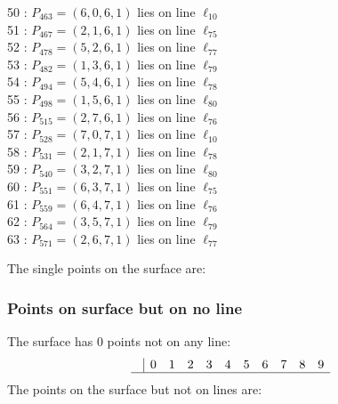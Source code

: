 \documentclass{article}
\begin{document}
{\begin{multicols}{2}
50 : $P_{463}=( 6, 0, 6, 1 )$ lies on line $\ell_{10}$\\
51 : $P_{467}=( 2, 1, 6, 1 )$ lies on line $\ell_{75}$\\
52 : $P_{478}=( 5, 2, 6, 1 )$ lies on line $\ell_{77}$\\
53 : $P_{482}=( 1, 3, 6, 1 )$ lies on line $\ell_{79}$\\
54 : $P_{494}=( 5, 4, 6, 1 )$ lies on line $\ell_{78}$\\
55 : $P_{498}=( 1, 5, 6, 1 )$ lies on line $\ell_{80}$\\
56 : $P_{515}=( 2, 7, 6, 1 )$ lies on line $\ell_{76}$\\
57 : $P_{528}=( 7, 0, 7, 1 )$ lies on line $\ell_{10}$\\
58 : $P_{531}=( 2, 1, 7, 1 )$ lies on line $\ell_{78}$\\
59 : $P_{540}=( 3, 2, 7, 1 )$ lies on line $\ell_{80}$\\
60 : $P_{551}=( 6, 3, 7, 1 )$ lies on line $\ell_{75}$\\
61 : $P_{559}=( 6, 4, 7, 1 )$ lies on line $\ell_{76}$\\
62 : $P_{564}=( 3, 5, 7, 1 )$ lies on line $\ell_{79}$\\
63 : $P_{571}=( 2, 6, 7, 1 )$ lies on line $\ell_{77}$\\
\end{multicols}
The single points on the surface are:\\
\subsubsection*{Points on surface but on no line}
The surface has 0 points not on any line:\\
$$
\begin{array}{r|*{10}{r}}
 & 0 & 1 & 2 & 3 & 4 & 5 & 6 & 7 & 8 & 9\\
\hline
\end{array}
$$
The points on the surface but not on lines are:\\
\begin{multicols}{2}
\noindent
\end{multicols}
}
\end{document}
